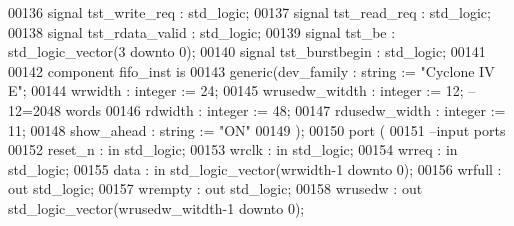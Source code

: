\begin{DoxyCode}
00136 \textcolor{keywordflow}{signal} \textcolor{vhdlchar}{tst_write_req}       \textcolor{vhdlchar}{:} \textcolor{comment}{std\_logic};
00137 \textcolor{keywordflow}{signal} \textcolor{vhdlchar}{tst_read_req}        \textcolor{vhdlchar}{:} \textcolor{comment}{std\_logic};
00138 \textcolor{keywordflow}{signal} \textcolor{vhdlchar}{tst_rdata_valid}     \textcolor{vhdlchar}{:} \textcolor{comment}{std\_logic};
00139 \textcolor{keywordflow}{signal} \textcolor{vhdlchar}{tst_be}              \textcolor{vhdlchar}{:} \textcolor{comment}{std\_logic\_vector}\textcolor{vhdlchar}{(}\textcolor{vhdllogic}{}\textcolor{vhdllogic}{3} \textcolor{keywordflow}{downto} \textcolor{vhdllogic}{}\textcolor{vhdllogic}{0}\textcolor{vhdlchar}{)};
00140 \textcolor{keywordflow}{signal} \textcolor{vhdlchar}{tst_burstbegin}      \textcolor{vhdlchar}{:} \textcolor{comment}{std\_logic};   
00141 
00142 \textcolor{keywordflow}{component} fifo_inst \textcolor{keywordflow}{is}
00143   \textcolor{keywordflow}{generic}(dev_family         : \textcolor{comment}{string}  := \textcolor{keyword}{"Cyclone IV E"};
00144           wrwidth         : \textcolor{comment}{integer} := \textcolor{vhdllogic}{}\textcolor{vhdllogic}{24};
00145           wrusedw_witdth  : \textcolor{comment}{integer} := \textcolor{vhdllogic}{}\textcolor{vhdllogic}{12}; \textcolor{keyword}{--12=2048 words }
00146           rdwidth         : \textcolor{comment}{integer} := \textcolor{vhdllogic}{}\textcolor{vhdllogic}{48};
00147           rdusedw_width   : \textcolor{comment}{integer} := \textcolor{vhdllogic}{}\textcolor{vhdllogic}{11};
00148           show_ahead      : \textcolor{comment}{string}  := \textcolor{keyword}{"ON"}
00149   );  
00150   \textcolor{keywordflow}{port} (
00151 \textcolor{keyword}{      --input ports }
00152       reset_n       : \textcolor{keywordflow}{in} \textcolor{comment}{std\_logic};
00153       wrclk         : \textcolor{keywordflow}{in} \textcolor{comment}{std\_logic};
00154       wrreq         : \textcolor{keywordflow}{in} \textcolor{comment}{std\_logic};
00155       data          : \textcolor{keywordflow}{in} \textcolor{comment}{std\_logic\_vector}(wrwidth\textcolor{vhdlchar}{-}\textcolor{vhdllogic}{}\textcolor{vhdllogic}{1} \textcolor{keywordflow}{downto} \textcolor{vhdllogic}{}\textcolor{vhdllogic}{0});
00156       wrfull        : \textcolor{keywordflow}{out} \textcolor{comment}{std\_logic};
00157         wrempty       : \textcolor{keywordflow}{out} \textcolor{comment}{std\_logic};
00158       wrusedw       : \textcolor{keywordflow}{out} \textcolor{comment}{std\_logic\_vector}(wrusedw_witdth\textcolor{vhdlchar}{-}\textcolor{vhdllogic}{}\textcolor{vhdllogic}{1} \textcolor{keywordflow}{downto} \textcolor{vhdllogic}{}\textcolor{vhdllogic}{0});

\end{DoxyCode}
